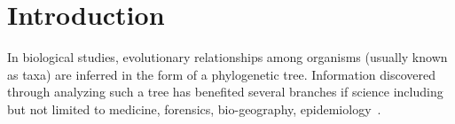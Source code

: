 \section{Introduction}
In biological studies, evolutionary relationships among organisms (usually known as taxa) are inferred in the form of a phylogenetic tree. Information discovered through analyzing such a tree has benefited several branches if science including but not limited to medicine, forensics, bio-geography, epidemiology~\cite{felix2015phylogenetics}. 